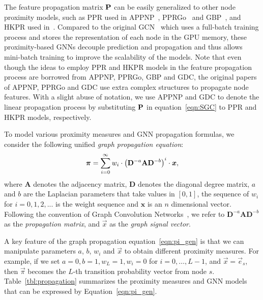 The feature propagation matrix $\P$ can be easily generalized to other node proximity models, such as PPR used in APPNP~\cite{Klicpera2018APPNP}, PPRGo~\cite{bojchevski2020scaling} and GBP~\cite{chen2020GBP}, and HKPR used in~\cite{klicpera2019GDC}. 
Compared to the original GCN~\cite{kipf2016GCN} which uses a full-batch training process and stores the representation of each node in the GPU memory, these proximity-based GNNs decouple prediction and propagation and thus allows mini-batch training to improve the scalability of the models. 
Note that even though the ideas to employ PPR and HKPR models in the feature propagation process are borrowed from APPNP, PPRGo, GBP and GDC, the original papers of APPNP, PPRGo and GDC use extra complex structures to propagate node features. With a slight abuse of notation, we use APPNP and GDC to denote the linear propagation process by substituting $\P$ in equation~\eqref{eqn:SGC} to PPR and HKPR models, respectively. 




  To model various proximity measures and GNN propagation formulas, we consider the following unified {\em graph propagation equation}:   
\vspace{-2mm}
\begin{equation}\label{eqn:pi_gen}
\vspace{-1mm}
	\begin{aligned}
		\vec{\pi}=\sum_{i=0}^\infty w_i \cdot \left(\mathbf{D}^{-a} \mathbf{A}  \mathbf{D}^{-b} \right)^i \cdot \vec{x}, 
	\end{aligned}
\end{equation}
where $\mathbf{A}$  denotes the adjacency matrix, $\mathbf{D}$ denotes the diagonal degree matrix, $a$ and $b$ are the Laplacian parameters that take values in $[0,1]$, the sequence of $w_i$ for $i=0,1,2,...$ is the weight sequence and $\bm{x}$ is an $n$ dimensional vector. Following the convention of Graph Convolution Networks~\cite{kipf2016GCN}, we refer to $\mathbf{D}^{-a}\mathbf{A}\mathbf{D}^{-b}$ as the {\em propagation matrix}, and $\vec{x}$ as the {\em graph signal vector}. 


A key feature of the graph propagation equation~\eqref{eqn:pi_gen} is that we can manipulate parameters $a$, $b$, $w_i$ and $\vec{x}$ to obtain different proximity measures. For example, if we set  $a=0, b=1, w_L=1,   w_i=0$ for $i=0,\ldots, L-1$, and $\vec{x}=\vec{e}_s$, then $\vec{\pi}$ becomes the $L$-th transition probability vector from node $s$. Table~\ref{tbl:propagation} summarizes the proximity measures and GNN models that can be expressed by Equation~\eqref{eqn:pi_gen}.  




